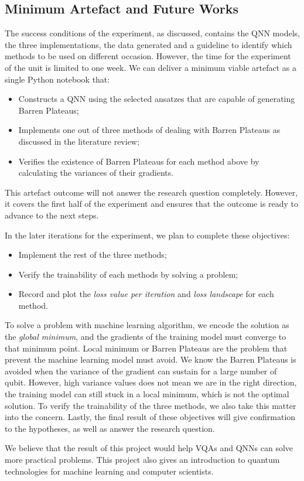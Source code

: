 \subsection{Minimum Artefact and Future Works}
\label{Minimum Artefacts}

The success conditions of the experiment, as discussed, contains the QNN models, the three implementations, the data generated and a guideline to identify which methods to be used on different occasion.
However, the time for the experiment of the unit is limited to one week. We can deliver a minimum viable artefact as a single Python notebook that:
\begin{itemize}
    \item Constructs a QNN using the selected ansatzes that are capable of generating Barren Plateaus;
    \item Implements one out of three methods of dealing with Barren Plateaus as discussed in the literature review;
    \item Verifies the existence of Barren Plateaus for each method above by calculating the variances of their gradients.
\end{itemize}

This artefact outcome will not answer the research question completely.
However, it covers the first half of the experiment and ensures that the outcome is ready to advance to the next steps.

In the later iterations for the experiment, we plan to complete these objectives:
\begin{itemize}
    \item Implement the rest of the three methods;
    \item Verify the trainability of each methods by solving a problem;
    \item Record and plot the \textit{loss value per iteration} and \textit{loss landscape} for each method.
\end{itemize}

To solve a problem with machine learning algorithm, we encode the solution as the \textit{global minimum}, and the gradients of the training model must converge to that minimum point.
Local minimum or Barren Plateaus are the problem that prevent the machine learning model must avoid.
We know the Barren Plateaus is avoided when the variance of the gradient can sustain for a large number of qubit.
However, high variance values does not mean we are in the right direction, the training model can still stuck in a local minimum, which is not the optimal solution.
To verify the trainability of the three methods, we also take this matter into the concern.
Lastly, the final result of these objectives will give confirmation to the hypotheses, as well as answer the research question.

We believe that the result of this project would help VQAs and QNNs can solve more practical problems. 
This project also gives an introduction to quantum technologies for machine learning and computer scientists.
